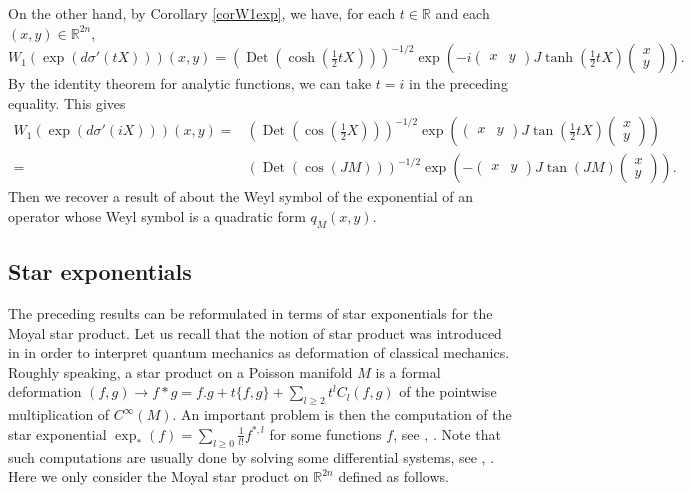 \documentclass[12pt]{amsart}
\numberwithin{equation}{section}
\DeclareMathOperator{\Det}{Det} \DeclareMathOperator{\Tr}{Tr}
\begin{document}
On the other hand, by Corollary \ref{corW1exp}, we have, for each $t\in {\mathbb R}$ and each $(x,y)\in  {\mathbb R}^{2n}$,
\begin{equation*}\label{eqHo2}W_1(\exp (d\sigma'(tX)))(x,y)=(\Det(\cosh (\tfrac{1}{2}tX)))^{-1/2}
\exp \left(-i\begin{pmatrix}x&y\end{pmatrix}J\tanh(\tfrac{1}{2}tX)
\begin{pmatrix}x\\y\end{pmatrix}\right).\end{equation*}
By the identity theorem for analytic functions, we can take $t=i$ in the preceding equality.
This gives
\begin{align*}
W_1(\exp (d\sigma'(iX)))(x,y)=&(\Det(\cos (\tfrac{1}{2}X)))^{-1/2}
\exp \left(\begin{pmatrix}x&y\end{pmatrix}J\tan (\tfrac{1}{2}tX)
\begin{pmatrix}x\\y\end{pmatrix}\right)\\
=&(\Det(\cos (JM)))^{-1/2}
\exp \left(-\begin{pmatrix}x&y\end{pmatrix}J\tan (JM)
\begin{pmatrix}x\\y\end{pmatrix}\right).
\end{align*}
Then we recover a result of \cite{Ho2} about the Weyl symbol of the exponential of an operator whose Weyl symbol is a quadratic form $q_M(x,y)$.

\subsection{Star exponentials} The preceding results can be reformulated in terms of star exponentials for the Moyal star product. Let us recall that the notion of star product was introduced in \cite{BFF0} in order to interpret quantum mechanics as deformation of classical mechanics. Roughly speaking, a star product on a Poisson manifold $M$ is a formal deformation
$(f,g)\rightarrow f\ast g=f.g+t\{f,g\}+\sum_{l\geq 2}t^lC_l(f,g)$ of the pointwise multiplication of
$C^{\infty}(M)$. An important problem is then the computation of the star exponential
$\exp_{\ast}(f)=\sum_{l\geq 0}\frac{1}{l!}f^{\ast,l}$ for some functions $f$, see \cite{Arn},
\cite{Fr}. Note that such computations are usually done by solving some differential systems,
see \cite{BFF}, \cite{BM}. Here we only consider the Moyal star product on ${\mathbb R}^{2n}$ defined as follows.
\end{document}
